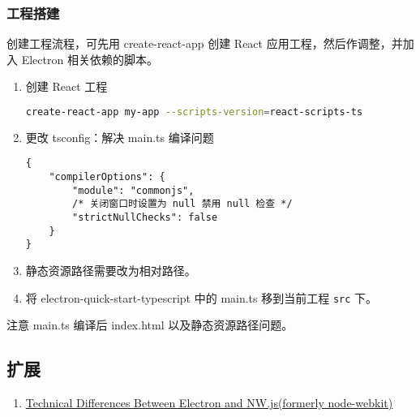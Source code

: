 \subsubsection{工程搭建}\label{ux5de5ux7a0bux642dux5efa}

创建工程流程，可先用 create-react-app 创建 React
应用工程，然后作调整，并加入 Electron 相关依赖的脚本。

\begin{enumerate}
\def\labelenumi{\arabic{enumi}.}
\item
  创建 React 工程

\begin{lstlisting}[language=bash]
create-react-app my-app --scripts-version=react-scripts-ts
\end{lstlisting}
\item
  更改 tsconfig：解决 main.ts 编译问题

\begin{lstlisting}
{
    "compilerOptions": {
        "module": "commonjs",
        /* 关闭窗口时设置为 null 禁用 null 检查 */
        "strictNullChecks": false
    }
}
\end{lstlisting}
\item
  静态资源路径需要改为相对路径。
\item
  将 electron-quick-start-typescript 中的 main.ts 移到当前工程
  \lstinline!src! 下。
\end{enumerate}

注意 main.ts 编译后 index.html 以及静态资源路径问题。

\subsection{扩展}\label{ux6269ux5c55-1}

\begin{enumerate}
\def\labelenumi{\arabic{enumi}.}
\tightlist
\item
  \href{https://electronjs.org/docs/development/atom-shell-vs-node-webkit}{Technical
  Differences Between Electron and NW.js(formerly node-webkit)}
\end{enumerate}
